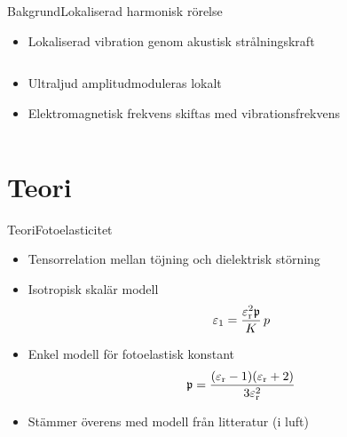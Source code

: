 \documentclass[11pt]{beamer}
\begin{document}
	\begin{frame}{Bakgrund}{Lokaliserad harmonisk rörelse}
		\begin{itemize}
			\item<1-> Lokaliserad vibration genom akustisk strålningskraft
		\end{itemize}
		\begin{columns}
			\begin{column}{0.45\textwidth}
				\begin{itemize}
					\item<2-> Ultraljud amplitudmoduleras lokalt
					\item<3-> Elektromagnetisk frekvens skiftas med vibrationsfrekvens
				\end{itemize}
			\end{column}
			\begin{column}{0.3\textwidth}
				\uncover<2->{
					\resizebox{!}{0.5\textheight}{
						
					}
				}
			\end{column}
			\hspace{0.05\textwidth}
			\begin{column}{0.2\textwidth}
				\uncover<2->{
					\resizebox{!}{0.5\textheight}{
						
					}
				}
			\end{column}
		\end{columns}
	\end{frame}
	
	\section{Teori}
	
	\begin{frame}{Teori}{Fotoelasticitet}
		\begin{itemize}
			\item Tensorrelation mellan töjning och dielektrisk störning
			\pause
			\item Isotropisk skalär modell
			\begin{equation*}
				\varepsilon_1 = \frac{\varepsilon_{\mathrm{r}}^2 \mathfrak{p}}{K} \,p
			\end{equation*}
			\pause
			\item Enkel modell för fotoelastisk konstant
			\begin{equation*}
				\mathfrak{p} = \frac{(\varepsilon_{\mathrm{r}} - 1)(\varepsilon_{\mathrm{r}} + 2)}{3\varepsilon_{\mathrm{r}}^2}
			\end{equation*}
			\pause
			\item Stämmer överens med modell från litteratur (i luft)
		\end{itemize}
	\end{frame}
	
\end{document}
